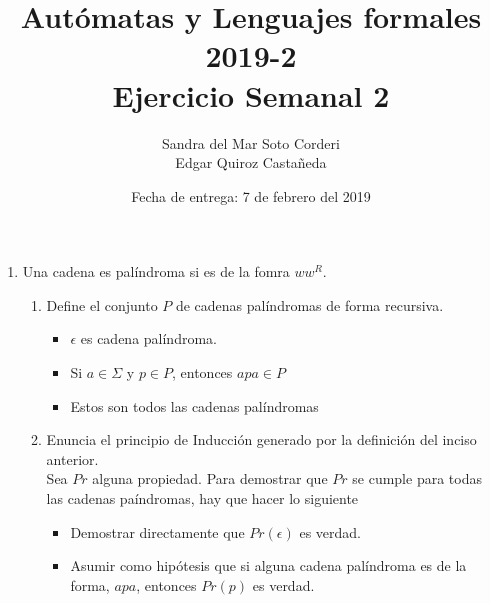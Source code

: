 \documentclass{article}
\begin{document}
    
    \title{Autómatas y Lenguajes formales 2019-2\\
    \large Ejercicio Semanal 2}

    \date{Fecha de entrega: 7 de febrero del 2019}

    \author{Sandra del Mar Soto Corderi\\
    Edgar Quiroz Castañeda}

    \maketitle


    \begin{enumerate}
        \item {
            Una cadena es palíndroma si es de la fomra $ww^R$.
            \begin{enumerate}
                \item {
                    Define el conjunto $P$ de cadenas palíndromas de forma 
                    recursiva.
                    \begin{itemize}
                        \item {
                            $\epsilon$ es cadena palíndroma.
                        }
                        \item {
                            Si $a \in \Sigma$ y $p \in P$, entonces $apa \in P$
                        }
                        \item {
                            Estos son todos las cadenas palíndromas 
                        }
                    \end{itemize}
                }
                \item {
                    Enuncia el principio de Inducción generado por la definición
                    del inciso anterior.\\
                    Sea $Pr$ alguna propiedad. Para demostrar que $Pr$ se cumple
                    para todas las cadenas paíndromas, hay que hacer lo siguiente
                    \begin{itemize}
                        \item {
                            Demostrar directamente que $Pr(\epsilon)$ es verdad.
                        }
                        \item {
                            Asumir como hipótesis que si alguna cadena 
                            palíndroma es de la forma, $apa$, entonces $Pr(p)$ es verdad.
}
\end{itemize}}
\end{enumerate}}
\end{enumerate}
\end{document}
